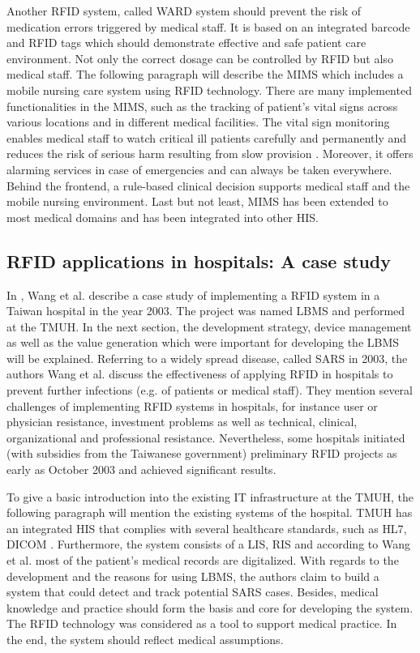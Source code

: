 Another RFID system, called \ac{WARD} system should prevent the risk of medication errors triggered by medical staff. It is based on an integrated barcode and RFID tags which should demonstrate effective and safe patient care environment. 
Not only the correct dosage can be controlled by RFID but also medical staff. The following paragraph will describe the \ac{MIMS} which includes a mobile nursing care system using RFID technology. There are many implemented functionalities in the MIMS, such as the tracking of patient's vital signs across various locations and in different medical facilities. The vital sign monitoring enables medical staff to watch critical ill patients carefully and permanently and reduces the risk of serious harm resulting from slow provision \cite{ncbi}. Moreover, it offers alarming services in case of emergencies and can always be taken everywhere. Behind the frontend, a rule-based clinical decision supports medical staff and the mobile nursing environment. Last but not least, MIMS has been extended to most medical domains and has been integrated into other HIS.

\subsection{RFID applications in hospitals: A case study}

In \cite{casestudy}, Wang et al. describe a case study of implementing a RFID system in a Taiwan hospital in the year 2003. The project was named \ac{LBMS} and performed at the \ac{TMUH}. In the next section, the development strategy, device management as well as the value generation which were important for developing the LBMS will be explained. 
Referring to a widely spread disease, called \ac{SARS} in 2003, the authors Wang et al. discuss the effectiveness of applying RFID in hospitals to prevent further infections (e.g. of patients or medical staff). They mention several challenges of implementing RFID systems in hospitals, for instance user or physician resistance, investment problems as well as technical, clinical, organizational and professional resistance. Nevertheless, some hospitals initiated (with subsidies from the Taiwanese government) preliminary RFID projects as early as October 2003 and achieved significant results. 

To give a basic introduction into the existing IT infrastructure at the TMUH, the following paragraph will mention the existing systems of the hospital. TMUH has an integrated HIS that complies with several healthcare standards, such as \ac{HL7}, \ac{DICOM} \cite[p.3 ff.]{casestudy}. Furthermore, the system consists of a LIS, RIS and according to Wang et al. most of the patient's medical records are digitalized. With regards to the development and the reasons for using LBMS, the authors claim to build a system that could detect and track potential SARS cases. Besides, medical knowledge and practice should form the basis and core for developing the system. The RFID technology was considered as a tool to support medical practice. In the end, the system should reflect medical assumptions. 

